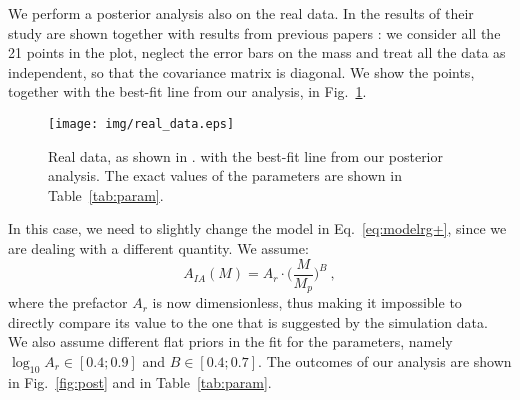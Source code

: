 \documentclass[a4paper,fleqn,usenatbib]{mnras}
\begin{document}
We perform a posterior analysis also on the real data. In \citet[figure 7]{vanUitertJoachimi2017} the results of their study are shown together with results from previous papers \citep{Joachimietal2011, Singhetal2015}: we consider all the 21 points in the plot, neglect the error bars on the mass
and treat all the data as independent, so that the covariance matrix is diagonal. We show the points, together with the best-fit line from our analysis, in Fig.~\ref{fig:realdata}.
\begin{figure}
	\centerline{	
	\texttt{[image: img/real\_data.eps]}}
	\caption{Real data, as shown in \citet[figure 7]{vanUitertJoachimi2017}. with the best-fit line from our posterior analysis. The exact values of the parameters are shown in Table~\ref{tab:param}.}
	\label{fig:realdata}
\end{figure}

In this case, we need to slightly change the model in Eq.~\ref{eq:modelrg+}, since we are dealing with a different quantity. We assume:
\begin{equation}
    A_{IA} (M) = A_r \cdot  \biggl ( \frac{M}{M_p} \biggl )^{B} \ ,
	\label{eq:modelrg+data}
\end{equation}
where the prefactor $A_r$ is now dimensionless, thus making it impossible to directly compare its value to the one that is suggested by the simulation data. We also assume different flat priors in the fit for the parameters, namely $\log_{10} A_r \in [0.4;0.9]$ and $B \in [0.4;0.7]$. The outcomes of our analysis are shown in Fig.~\ref{fig:post}\protect{} and in Table~\ref{tab:param}.
\end{document}

